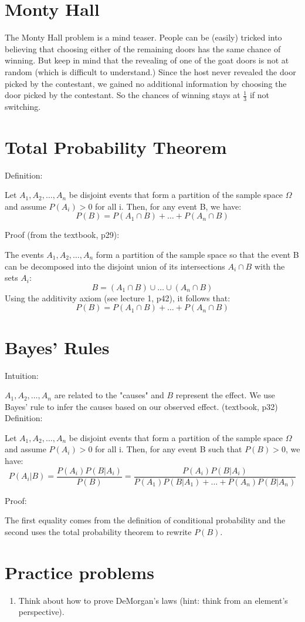 \documentclass[11pt]{article}
\begin{document}
\section{Monty Hall}
The Monty Hall problem is a mind teaser. 
People can be (easily) tricked into believing that choosing either of the remaining doors has the same chance of winning.
But keep in mind that the revealing of one of the goat doors is not at random (which is difficult to understand.)
Since the host never revealed the door picked by the contestant, we gained no additional information by choosing the door picked by the contestant. 
So the chances of winning stays at $\frac{1}{3}$ if not switching.

\section{Total Probability Theorem}
Definition:

Let $A_1, A_2, \ldots, A_n$ be disjoint events that form a partition of the sample space $\Omega$ and assume $P(A_i) > 0$ for all i. 
Then, for any event B, we have: 
$$P(B) = P(A_1 \cap B) + \ldots + P(A_n \cap B)$$

\noindent Proof (from the textbook, p29):

The events $A_1, A_2, \ldots, A_n$ form a partition of the sample space so that the event B can be decomposed into the disjoint union of its intersections $A_i \cap B$ with the sets $A_i$:
$$ B = (A_1 \cap B) \cup \ldots \cup (A_n \cap B)$$
Using the additivity axiom (see lecture 1, p42), it follows that:
$$ P(B) = P(A_1 \cap B) + \ldots + P(A_n \cap B)$$

\section{Bayes' Rules}
Intuition:

$A_1, A_2, \ldots, A_n$ are related to the "causes" and $B$ represent the effect.
We use Bayes' rule to infer the causes based on our observed effect. (textbook, p32) \newline
\newline \noindent Definition:

Let $A_1, A_2, \ldots, A_n$ be disjoint events that form a partition of the sample space $\Omega$ and assume $P(A_i) > 0$ for all i. 
Then, for any event B such that $P(B) > 0$, we have: 
$$P(A_i | B) = \frac{P(A_i)P(B | A_i)}{P(B)} = \frac{P(A_i)P(B | A_i)}{P(A_1)P(B | A_1) + \ldots + P(A_n)P(B | A_n)}$$

\noindent Proof:

The first equality comes from the definition of conditional probability and the second uses the total probability theorem to rewrite $P(B)$. 

\section{Practice problems}
\begin{enumerate}
  \item Think about how to prove DeMorgan's laws (hint: think from an element's perspective).
\end{enumerate}

\end{document}
